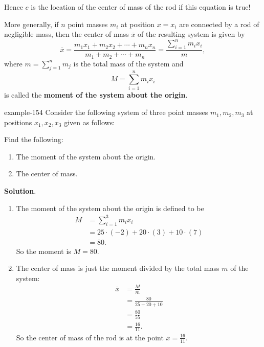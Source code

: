 \documentclass[10pt,]{book}
\newcommand{\terminology}[1]{\textbf{#1}}
\numberwithin{equation}{section}
\newcommand{\amp}{&}
\begin{document}
Hence \(c\) is the location of the center of mass of the rod if this equation is true!%
\par
\hypertarget{p-691}{}%
More generally, if \(n\) point masses \(m_{i}\) at position \(x=x_{i}\) are connected by a rod of negligible mass, then the center of mass \(\overline{x}\) of the resulting system is given by%
\begin{equation*}
\overline{x} = \frac{m_{1}x_{1}+m_{2}x_{2}+\cdots+m_{n}x_{n}}{m_{1}+m_{2}+\cdots+m_{n}} = \frac{\sum_{i=1}^{n}m_{i}x_{i}}{m},
\end{equation*}
where \(m = \sum_{j=1}^{n}m_{j}\) is the total mass of the system and%
\begin{equation*}
M = \sum_{i=1}^{n}m_{i}x_{i}
\end{equation*}
is called the \terminology{moment of the system about the origin}.%
\begin{example}{}{example-154}%
\hypertarget{p-692}{}%
Consider the following system of three point masses \(m_{1},m_{2},m_{3}\) at positions \(x_{1},x_{2},x_{3}\) given as follows:%
\par
\hypertarget{p-693}{}%
Find the following: \leavevmode%
\begin{enumerate}
\item\hypertarget{li-55}{}\hypertarget{p-694}{}%
The moment of the system about the origin.%
\item\hypertarget{li-56}{}\hypertarget{p-695}{}%
The center of mass.%
\end{enumerate}
%
\par\smallskip%
\noindent\textbf{Solution}.\hypertarget{solution-150}{}\quad%
\leavevmode%
\begin{enumerate}
\item\hypertarget{li-57}{}\hypertarget{p-696}{}%
The moment of the system about the origin is defined to be%
\begin{align*}
M \amp= \sum_{i=1}^{3}m_{i}x_{i}\\
\amp= 25\cdot(-2)+20\cdot(3)+10\cdot(7)\\
\amp= 80.
\end{align*}
So the moment is \(M = 80\).%
\item\hypertarget{li-58}{}\hypertarget{p-697}{}%
The center of mass is just the moment divided by the total mass \(m\) of the system:%
\begin{align*}
\overline{x}\amp= \frac{M}{m}\\
\amp= \frac{80}{25+20+10}\\
\amp= \frac{80}{55}\\
\amp= \frac{16}{11}.
\end{align*}
So the center of mass of the rod is at the point \(\overline{x} = \frac{16}{11}\).%
\end{enumerate}
\end{example}
\end{document}
